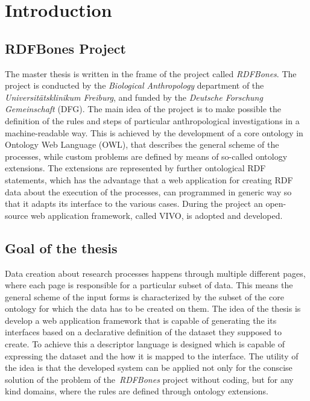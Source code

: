 \chapter{Introduction}


\section{RDFBones Project}

The master thesis is written in the frame of the project called \textit{RDFBones}. The project is conducted by the \textit{Biological Anthropology} department of the \textit{Universitätsklinikum Freiburg}, and funded by the \textit{Deutsche Forschung Gemeinschaft} (DFG). The main idea of the project is to make possible the definition of the rules and steps of particular anthropological investigations in a machine-readable way. This is achieved by the development of a core ontology in Ontology Web Language (OWL), that describes the general scheme of the processes, while custom problems are defined by means of so-called ontology extensions. The extensions are represented by further ontological RDF statements, which has the advantage that a web application for creating RDF data about the execution of the processes, can programmed in generic way so that it adapts its interface to the various cases. During the project an open-source web application framework, called VIVO, is adopted and developed.

\section{Goal of the thesis}

Data creation about research processes happens through multiple different pages, where each page is responsible for a particular subset of data. This means the general scheme of the input forms is characterized by the subset of the core ontology for which the data has to be created on them. The idea of the thesis is develop a web application framework that is capable of generating the its interfaces based on a declarative definition of the dataset they supposed to create. To achieve this a descriptor language is designed which is capable of expressing the dataset and the how it is mapped to the interface. The utility of the idea is that the developed system can be applied not only for the conscise solution of the problem of the \textit{RDFBones} project without coding, but for any kind domains, where the rules are defined through ontology extensions.



